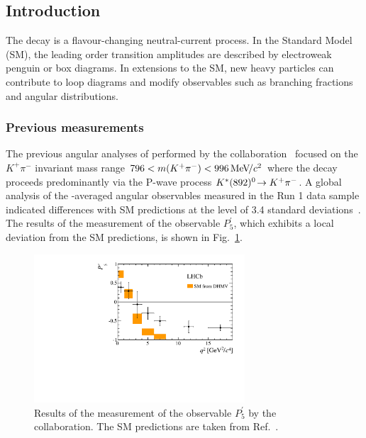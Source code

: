 \subsection{Introduction}
\label{sec:kpimm:introduction}

The decay \BdToKpimm is a flavour-changing neutral-current process. In the Standard Model (SM), the leading order transition amplitudes are described by electroweak penguin or box diagrams.  In extensions to the SM, new heavy particles can contribute to loop diagrams and modify observables such as branching fractions and angular distributions.

\subsubsection[Previous \btosll measurements]{Previous \boldmath{\btosll} measurements}
The previous angular analyses of \BdToKpimm performed by the \lhcb collaboration~\cite{LHCB-PAPER-2011-020,LHCB-PAPER-2013-019,LHCB-PAPER-2013-037,LHCB-PAPER-2015-051} focused on the $K^{+}\pi^{-}$ invariant mass range $796<m({{K}^+}{{\pi}^-})<996{\mathrm{\,Me\kern -0.1em V\!/}c^2}$ where the decay proceeds predominantly via the P-wave process ${{K}^*}(892)^{0}\!\rightarrow {\ensuremath{{K}^+}}{\ensuremath{{\pi}^-}}$. A global analysis of the \CP-averaged angular observables measured in the \lhcb Run 1 data sample indicated differences with SM predictions at the level of 3.4 standard deviations~\cite{LHCB-PAPER-2015-051}. The results of the measurement of the observable $P_{5}^{'}$, which exhibits a local deviation from the SM predictions, is shown in Fig.~\ref{fig:kpimm:p5prime}.

\begin{figure}[!b]
\centering
\includegraphics[width=0.7\textwidth]{figs/kpimm/introduction/P5prime.pdf}
\caption{Results of the measurement of the observable $P_{5}^{'}$ by the \lhcb collaboration. The SM predictions are taken from Ref.~\cite{pprime-theory}.}
\label{fig:kpimm:p5prime}
\end{figure}

